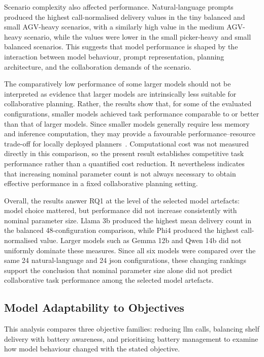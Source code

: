 Scenario complexity also affected performance. Natural-language prompts produced the highest call-normalised delivery values in the tiny balanced and small AGV-heavy scenarios, with a similarly high value in the medium AGV-heavy scenario, while the values were lower in the small picker-heavy and small balanced scenarios. This suggests that model performance is shaped by the interaction between model behaviour, prompt representation, planning architecture, and the collaboration demands of the scenario.

The comparatively low performance of some larger models should not be interpreted as evidence that larger models are intrinsically less suitable for collaborative planning. Rather, the results show that, for some of the evaluated configurations, smaller models achieved task performance comparable to or better than that of larger models. Since smaller models generally require less memory and inference computation, they may provide a favourable performance--resource trade-off for locally deployed planners~\cite{dawane2026onddeviceslm}. Computational cost was not measured directly in this comparison, so the present result establishes competitive task performance rather than a quantified cost reduction. It nevertheless indicates that increasing nominal parameter count is not always necessary to obtain effective performance in a fixed collaborative planning setting.

Overall, the results answer RQ1 at the level of the selected model artefacts: model choice mattered, but performance did not increase consistently with nominal parameter size. Llama 3b produced the highest mean delivery count in the balanced 48-configuration comparison, while Phi4 produced the highest call-normalised value. Larger models such as Gemma 12b and Qwen 14b did not uniformly dominate these measures. Since all six models were compared over the same 24 natural-language and 24 \gls{json} configurations, these changing rankings support the conclusion that nominal parameter size alone did not predict collaborative task performance among the selected model artefacts.

\subsection{Model Adaptability to Objectives}
\label{sec:results_objective_sensitivity}

This analysis compares three objective families: reducing \gls{llm} calls, balancing shelf delivery with battery awareness, and prioritising battery management to examine how model behaviour changed with the stated objective.

